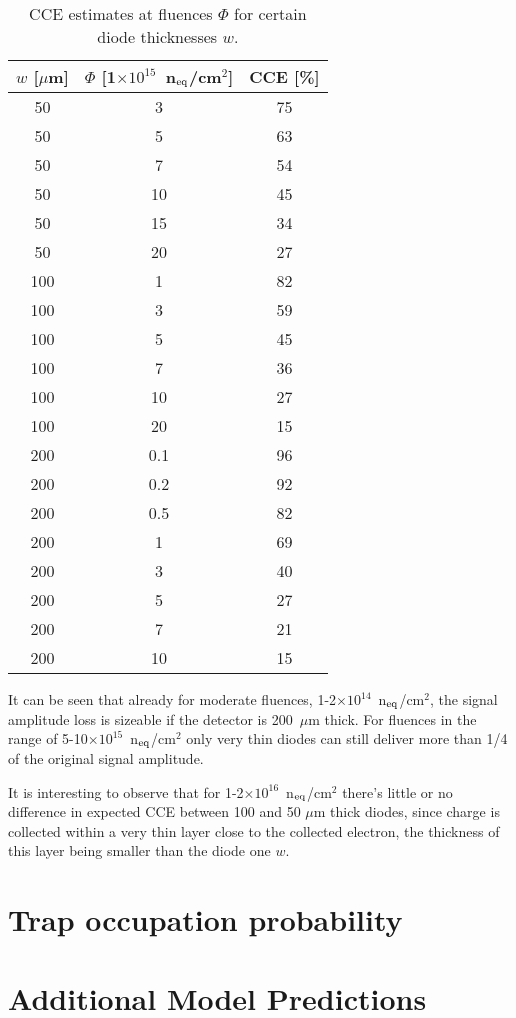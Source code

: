 \begin{table}[!htbp]
\centering
\begin{tabular}{ccc}
\hline
$w$ [$\mu$m] & $\Phi$ [1$\times10^{15}$~n$_{\rm eq}$/cm$^2$] & CCE [\%] \\
\hline
\hline
50 & 3 & 75 \\
50 & 5 & 	63 \\
50 & 7 & 54 \\
50 & 	10 & 	45 \\
50 & 15 & 34 \\
50 & 20 & 27\\
\hline
100 & 1 & 82 \\
100 & 3 & 59 \\
100 & 5 & 	45 \\
100 & 7 & 36 \\
100 & 10 & 27 \\
100 & 20 & 15 \\
\hline
200 & 0.1 & 96\\
200 & 0.2 & 92\\
200 & 0.5 & 82\\
200 & 1 & 69 \\
200 & 3 & 40 \\
200 & 5 & 	27 \\
200 & 7 & 21 \\
200 & 10 & 15 \\
\hline
\end{tabular}
\caption{\label{tab:cce_scenarios}CCE estimates at fluences $\Phi$ for 
certain diode thicknesses $w$.}
\end{table}

It can be seen that already for moderate fluences, 1-2$\times10^{14}$~n$_{\rm eq}$/cm$^2$, 
the signal amplitude loss is sizeable if the detector is 200~$\mu$m thick. 
For fluences in the range of 5-10$\times10^{15}$~n$_{\rm eq}$/cm$^2$ only very thin diodes 
can still deliver more than 1/4 of the original signal amplitude. 

It is interesting to observe that for 1-2$\times10^{16}$~n$_{\rm eq}$/cm$^2$ there's little or no 
difference in expected CCE between 100 and 50 $\mu$m thick diodes, since charge is collected 
within a very thin layer close to the collected electron, the thickness of this layer being smaller 
than the diode one $w$.

\chapter{Trap occupation probability}
\label{sec:trapoccprob}

\chapter{Additional Model Predictions}
\label{sec:additional}



